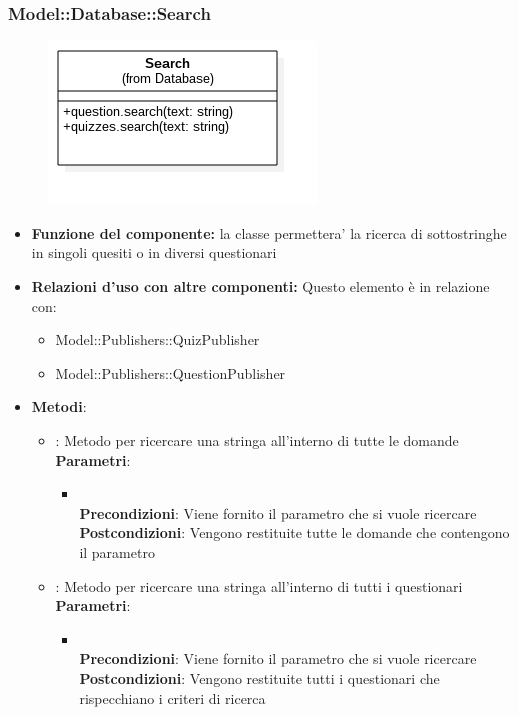 \subsubsection{Model::Database::Search}
\begin{figure}[h!]
\begin{center}
	\includegraphics[scale=0.6]{../images/Model/Database/Search.png}
\end{center}
\end{figure}
\begin{itemize}
\item\textbf{Funzione del componente:} la classe permettera' la ricerca di sottostringhe in singoli quesiti o in diversi questionari 
\item\textbf{Relazioni d'uso con altre componenti:} 
Questo elemento è in relazione con:
\begin{itemize}
\item Model::Publishers::QuizPublisher\\
\item Model::Publishers::QuestionPublisher\\
\end{itemize}  
\item\textbf{Metodi}:
\begin{itemize}
	\item{} : Metodo per ricercare una stringa all'interno di tutte le domande\\
	\textbf{Parametri}:
	\begin{itemize}
		\item{}\\
		\textbf{Precondizioni}: Viene fornito il parametro che si vuole ricercare\\
		\textbf{Postcondizioni}: Vengono restituite tutte le domande che contengono il parametro\\
	\end{itemize}
	\item{} :  Metodo per ricercare una stringa all'interno di tutti i questionari\\
	\textbf{Parametri}:
	\begin{itemize}
		\item{}\\
		\textbf{Precondizioni}: Viene fornito il parametro che si vuole ricercare\\
		\textbf{Postcondizioni}: Vengono restituite tutti i questionari che rispecchiano i criteri di ricerca\\
	\end{itemize}
\end{itemize}
\end{itemize}
\newpage


